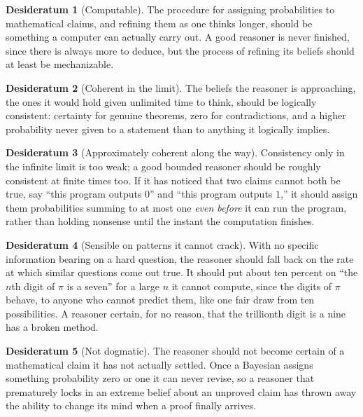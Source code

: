 \documentclass[10pt]{article}
\theoremstyle{definition}
\newtheorem{desideratum}{Desideratum}
\theoremstyle{remark}
\begin{document}
\begin{desideratum}[Computable]
The procedure for assigning probabilities to mathematical claims, and refining them as one thinks longer, should be something a computer can actually carry out. A good reasoner is never finished, since there is always more to deduce, but the process of refining its beliefs should at least be mechanizable.
\end{desideratum}

\begin{desideratum}[Coherent in the limit]
The beliefs the reasoner is approaching, the ones it would hold given unlimited time to think, should be logically consistent: certainty for genuine theorems, zero for contradictions, and a higher probability never given to a statement than to anything it logically implies.
\end{desideratum}

\begin{desideratum}[Approximately coherent along the way]
Consistency only in the infinite limit is too weak; a good bounded reasoner should be roughly consistent at finite times too. If it has noticed that two claims cannot both be true, say ``this program outputs $0$'' and ``this program outputs $1$,'' it should assign them probabilities summing to at most one \emph{even before} it can run the program, rather than holding nonsense until the instant the computation finishes.
\end{desideratum}

\begin{desideratum}[Sensible on patterns it cannot crack]
With no specific information bearing on a hard question, the reasoner should fall back on the rate at which similar questions come out true. It should put about ten percent on ``the $n$th digit of $\pi$ is a seven'' for a large $n$ it cannot compute, since the digits of $\pi$ behave, to anyone who cannot predict them, like one fair draw from ten possibilities. A reasoner certain, for no reason, that the trillionth digit is a nine has a broken method.
\end{desideratum}

\begin{desideratum}[Not dogmatic]
The reasoner should not become certain of a mathematical claim it has not actually settled. Once a Bayesian assigns something probability zero or one it can never revise, so a reasoner that prematurely locks in an extreme belief about an unproved claim has thrown away the ability to change its mind when a proof finally arrives.
\end{desideratum}
\end{document}
